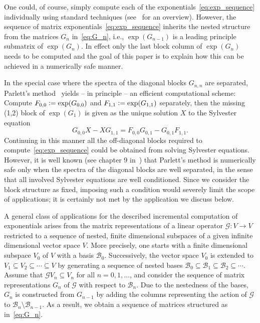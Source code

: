 One could, of course, simply compute each of the exponentials~\eqref{eq:exp_sequence} individually using standard techniques (see~\cite{Moler2003} for an overview).
However, the sequence of matrix exponentials~\eqref{eq:exp_sequence}
inherits the nested structure from the matrices $G_n$ in~\eqref{eq:G_n},
i.e., $\exp(G_{n-1})$ is a leading principle submatrix of $\exp(G_n)$.
In effect only the last block column of $\exp(G_n)$ needs to be computed and the goal of this paper is to explain how this can be achieved in a numerically safe manner.

In the special case where the spectra of the diagonal blocks $G_{n,n}$
are separated, Parlett's method~\cite{Parlett1976} yields -- in principle -- an efficient computational scheme:  Compute $F_{0,0} \mathrel{\mathop:}=
\exp(G_{0,0})$ and $F_{1,1} \mathrel{\mathop:}= \exp(G_{1,1})$ separately, then the
missing (1,2) block of $\exp(G_1)$ is given as the unique solution $X$ to
the Sylvester equation
\begin{equation*}
    G_{0,0} X - X G_{1,1} = F_{0,0} G_{0,1} - G_{0,1} F_{1,1}.
\end{equation*}
Continuing in this manner all the off-diagonal blocks required to compute~\eqref{eq:exp_sequence} could be
obtained from solving Sylvester equations. However, it is well known (see chapter 9 in~\cite{Higham2008}) that Parlett's method is numerically safe only when the spectra of the diagonal blocks are well separated, in the sense that all involved Sylvester equations are well conditioned. Since we consider the block structure as fixed, imposing such a condition would severely limit the scope of applications; it is certainly not met by the application we discuss below. 

A general class of applications for the described incremental
computation of exponentials arises from the matrix representations of
a linear operator $\mathcal{G} : V \to V$ restricted to a sequence of nested, finite
dimensional subspaces of a given infinite dimensional vector space $V$.
More precisely, one starts with a
finite dimensional subspace $V_0$ of $V$ with a basis $\mathcal{B}_0$.
Successively, the vector space $V_0$ is extended to $V_1 \subseteq V_2
\subseteq \cdots \subseteq V$ by generating a sequence of nested bases
$\mathcal{B}_0 \subseteq \mathcal{B}_1 \subseteq
\mathcal{B}_2\subseteq \cdots$. Assume that $\mathcal{G} V_n \subseteq V_n$ for all
$n=0,1,\dotsc$, and consider the sequence of matrix representations
$G_{n}$ of $\mathcal{G}$ with respect to $\mathcal{B}_n$.  Due to the
nestedness of the bases, $G_n$ is constructed from
$G_{n-1}$ by adding the columns representing the action of
$\mathcal{G}$ to $\mathcal{B}_n \setminus \mathcal{B}_{n-1}$.
As a
result, we obtain a sequence of matrices structured as
in~\eqref{eq:G_n}. 

